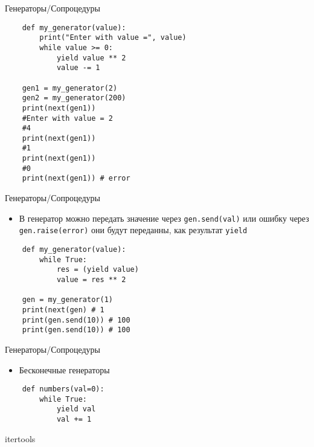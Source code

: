 \documentclass{article}
\begin{document}
\begin{center} Генераторы/Сопроцедуры \end{center}
\vspace{15pt}
\begin{lstlisting}
    def my_generator(value):
        print("Enter with value =", value)
        while value >= 0:
            yield value ** 2
            value -= 1

    gen1 = my_generator(2)
    gen2 = my_generator(200)
    print(next(gen1))
    #Enter with value = 2
    #4
    print(next(gen1))
    #1
    print(next(gen1))
    #0
    print(next(gen1)) # error
\end{lstlisting}
\newpage

\begin{center} Генераторы/Сопроцедуры \end{center}
\begin{itemize}
    \item В генератор можно передать значение через \lstinline!gen.send(val)!
        или ошибку через \lstinline!gen.raise(error)! они будут переданны, как
        результат \lstinline!yield!
\end{itemize}
\vspace{15pt}
\begin{lstlisting}
    def my_generator(value):
        while True:
            res = (yield value)
            value = res ** 2

    gen = my_generator(1)
    print(next(gen) # 1
    print(gen.send(10)) # 100
    print(gen.send(10)) # 100
\end{lstlisting}
\newpage

\begin{center} Генераторы/Сопроцедуры \end{center}
\begin{itemize}
    \item Бесконечные генераторы
\end{itemize}
\vspace{15pt}
\begin{lstlisting}
    def numbers(val=0):
        while True:
            yield val
            val += 1
\end{lstlisting}
\newpage

\begin{center} itertools \end{center}
\newpage
\end{document}
